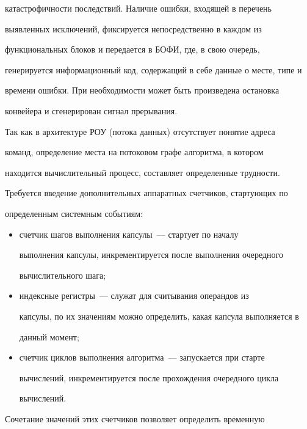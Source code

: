 катастрофичности последствий. Наличие ошибки, входящей в перечень 


выявленных исключений, фиксируется непосредственно в каждом из 


функциональных блоков и передается в БОФИ, где, в свою очередь, 


генерируется информационный код, содержащий в себе данные о месте, типе и 


времени ошибки. При необходимости может быть произведена остановка 


конвейера и сгенерирован сигнал прерывания.


      


      Так как в архитектуре РОУ (потока данных) отсутствует понятие адреса 


команд, определение места на потоковом графе алгоритма, в котором 


находится вычислительный процесс, составляет определенные трудности. 


Требуется введение дополнительных аппаратных счетчиков, стартующих по 


определенным системным событиям:


      \begin{itemize}


      \item счетчик шагов выполнения кап\-су\-лы~--- стартует по началу 


выполнения капсулы, инкрементируется после выполнения очередного 


вычислительного шага; 


      \item индексные регистры~--- служат для считывания операндов из 


капсулы, по их значениям можно определить, какая капсула выполняется в 


данный момент;


      \item счетчик циклов выполнения алгоритма~--- запускается при старте 


вычислений, инкрементируется после прохождения очередного цикла 


вычислений.


      \end{itemize}


      


      Сочетание значений этих счетчиков позволяет определить временную 



